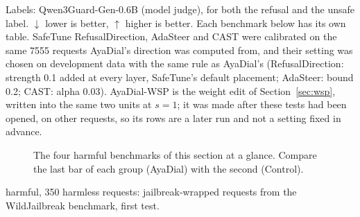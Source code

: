\documentclass[10pt,a4paper]{article}
\begin{document}
Labels: Qwen3Guard-Gen-0.6B (model judge), for both the refusal and the unsafe label. $\downarrow$ lower is better, $\uparrow$ higher is better. Each benchmark below has its own table. SafeTune RefusalDirection, AdaSteer and CAST were calibrated on the same 7555 requests AyaDial's direction was computed from, and their setting was chosen on development data with the same rule as AyaDial's (RefusalDirection: strength 0.1 added at every layer, SafeTune's default placement; AdaSteer: bound 0.2; CAST: alpha 0.03). AyaDial-WSP is the weight edit of Section~\ref{sec:wsp}, written into the same two units at $s = 1$; it was made after these tests had been opened, on other requests, so its rows are a later run and not a setting fixed in advance.

\begin{figure}[H]\centering
{}
\caption{The four harmful benchmarks of this section at a glance. Compare the last bar of each group (AyaDial) with the second (Control).}\label{fig:t1}
\end{figure}
\vspace{-3pt} harmful, 350 harmless requests: jailbreak-wrapped requests from the WildJailbreak benchmark, first test.
\end{document}

